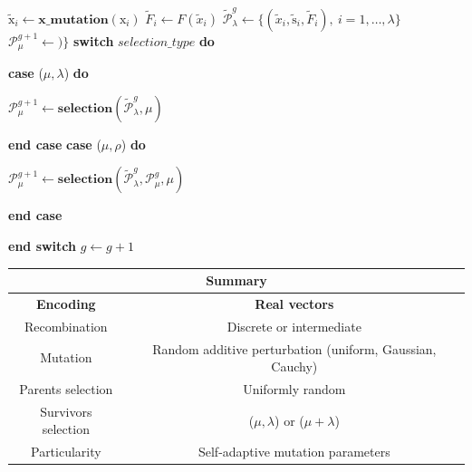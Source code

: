 \documentclass{book}
\makeatletter
\newcommand{\SWITCH}[1]{\STATE \textbf{switch} #1 \textbf{do}\begin{ALC@g}}
\newcommand{\ENDSWITCH}{\end{ALC@g}\STATE \textbf{end switch}}
\newcommand{\CASE}[1]{\STATE \textbf{case} #1 \textbf{do} \begin{ALC@g}}
\newcommand{\ENDCASE}{\end{ALC@g}\STATE \textbf{end case}}
\makeatother
\begin{document}
\begin{itemize}
\begin{algorithm}[]
\begin{algorithmic}[1]
                    \STATE $\tilde{\text{x}}_i\gets \textbf{x\_mutation}(\text{x}_i)$
                    \STATE $\tilde{F}_i\gets F(\tilde{x}_i)$
                \ENDFOR
                \STATE $\tilde{\mathcal{P}}_{\lambda}^g\gets \{(\tilde{x}_i, \tilde{\text{s}}_i, \tilde{F}_i), \ i=1,\dots,\lambda\}$
                \STATE $\mathcal{P}_{\mu}^{g+1}\gets)\}$
                \SWITCH {$selection\_type$}
                    \CASE{($\mu, \lambda$)}
                        \STATE $\mathcal{P}_{\mu}^{g+1}\gets \textbf{selection}(\tilde{\mathcal{P}}_{\lambda}^g, \mu)$
                    \ENDCASE
                    \CASE{($\mu, \rho$)}
                        \STATE $\mathcal{P}_{\mu}^{g+1}\gets \textbf{selection}(\tilde{\mathcal{P}}_{\lambda}^g, \mathcal{P}_{\mu}^g, \mu)$
                    \ENDCASE
                \ENDSWITCH
                \STATE $g\gets g+1$
            \ENDWHILE
        \end{algorithmic}
    \end{algorithm}
\end{itemize}
\vspace{-0.79cm}
\begin{table}[]
    \centering
    \begin{tabular}{|c|c|}
        \toprule
        \multicolumn{2}{|c|}{\textbf{Summary}} \\
        \midrule
        \textbf{Encoding} & \textbf{Real vectors} \\
        \midrule
        Recombination & Discrete or intermediate \\
        Mutation & Random additive perturbation (uniform, Gaussian, Cauchy) \\
        Parents selection & Uniformly random \\
        Survivors selection & ($\mu, \lambda$) or ($\mu + \lambda$) \\
        Particularity & Self-adaptive mutation parameters \\
        \bottomrule
    \end{tabular}
\end{table}
\end{document}
